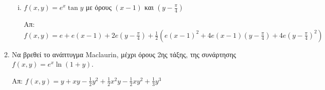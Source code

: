 \begin{enumerate}
\begin{enumerate}[i)]
\item $ f(x,y)=e^{x}\tan{y} $ με όρους $ (x-1) $ και $ \left(y - \frac{
	\pi }{ 4 }\right) $

	\hfill Απ: $\scriptstyle{ f(x,y) = e + e(x-1) + 2e\left(y- \frac{ \pi }{ 4 }\right)+ \frac{1}{ 2 } \left(e(x-1)^{2}+4e(x-1)\left(y- \frac{ \pi }{ 4 }\right) + 4e\left(y- \frac{ \pi }{ 4 }
\right)^{2}\right)} $
\end{enumerate}

\item Να βρεθεί το ανάπτυγμα Maclaurin, μέχρι όρους 2ης τάξης, της συνάρτησης $ f(x,y)
	= e^{x}\ln(1+y)$.

	\hfill Απ: $\scriptstyle{ f(x,y)=y + xy - \frac{1}{ 2 } y^{2} + \frac{1}{ 2 } x^{2}y - \frac{1}{
	2 } xy^{2} + \frac{1}{ 3 } y^{3}} $





\end{enumerate}



